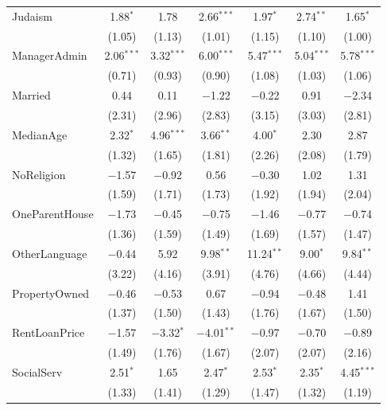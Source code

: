 \documentclass[11pt,a4paper,]{article}
\begin{document}
\begin{table}[!htbp]
\begin{tabular}{@{\extracolsep{1pt}}lcccccc}
 Judaism & 1.88$^{*}$ & 1.78 & 2.66$^{***}$ & 1.97$^{*}$ & 2.74$^{**}$ & 1.65$^{*}$ \\
  & (1.05) & (1.13) & (1.01) & (1.15) & (1.10) & (1.00) \\

 ManagerAdmin & 2.06$^{***}$ & 3.32$^{***}$ & 6.00$^{***}$ & 5.47$^{***}$ & 5.04$^{***}$ & 5.78$^{***}$ \\
  & (0.71) & (0.93) & (0.90) & (1.08) & (1.03) & (1.06) \\

 Married & 0.44 & 0.11 & $-$1.22 & $-$0.22 & 0.91 & $-$2.34 \\
  & (2.31) & (2.96) & (2.83) & (3.15) & (3.03) & (2.81) \\

 MedianAge & 2.32$^{*}$ & 4.96$^{***}$ & 3.66$^{**}$ & 4.00$^{*}$ & 2.30 & 2.87 \\
  & (1.32) & (1.65) & (1.81) & (2.26) & (2.08) & (1.79) \\

 NoReligion & $-$1.57 & $-$0.92 & 0.56 & $-$0.30 & 1.02 & 1.31 \\
  & (1.59) & (1.71) & (1.73) & (1.92) & (1.94) & (2.04) \\

 OneParentHouse & $-$1.73 & $-$0.45 & $-$0.75 & $-$1.46 & $-$0.77 & $-$0.74 \\
  & (1.36) & (1.59) & (1.49) & (1.69) & (1.57) & (1.47) \\

 OtherLanguage & $-$0.44 & 5.92 & 9.98$^{**}$ & 11.24$^{**}$ & 9.00$^{*}$ & 9.84$^{**}$ \\
  & (3.22) & (4.16) & (3.91) & (4.76) & (4.66) & (4.44) \\

 PropertyOwned & $-$0.46 & $-$0.53 & 0.67 & $-$0.94 & $-$0.48 & 1.41 \\
  & (1.37) & (1.50) & (1.43) & (1.76) & (1.67) & (1.50) \\

 RentLoanPrice & $-$1.57 & $-$3.32$^{*}$ & $-$4.01$^{**}$ & $-$0.97 & $-$0.70 & $-$0.89 \\
  & (1.49) & (1.76) & (1.67) & (2.07) & (2.07) & (2.16) \\

 SocialServ & 2.51$^{*}$ & 1.65 & 2.47$^{*}$ & 2.53$^{*}$ & 2.35$^{*}$ & 4.45$^{***}$ \\
  & (1.33) & (1.41) & (1.29) & (1.47) & (1.32) & (1.19) \\


\end{tabular}
\end{table}
\end{document}
